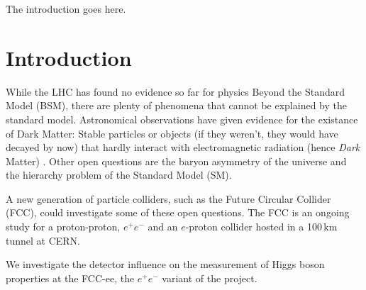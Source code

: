 The introduction goes here.

\section{Introduction}
While the LHC has found no evidence so far for physics Beyond the Standard Model (BSM), there are plenty of phenomena that cannot be explained by the standard model. Astronomical observations have given evidence for the existance of Dark Matter: Stable particles or objects (if they weren't, they would have decayed by now) that hardly interact with electromagnetic radiation (hence \emph{Dark} Matter) \cite{pdg14}. 
Other open questions are the baryon asymmetry of the universe and the hierarchy problem of the Standard Model (SM).

A new generation of particle colliders, such as the Future Circular Collider (FCC), could investigate some of these open questions. The FCC is an ongoing study for a proton-proton, $e^+ e^-$ and an $e$-proton collider hosted in a 100\,km tunnel at CERN.

We investigate the detector influence on the measurement of Higgs boson properties at the FCC-ee, the $e^+ e^-$ variant of the project.